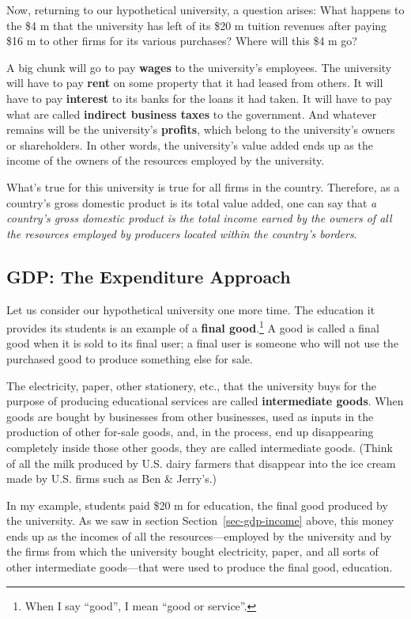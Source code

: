 \documentclass[
  letterpaper,
]{book}
\begin{document}
Now, returning to our hypothetical university, a question arises: What
happens to the \$4 m that the university has left of its \$20 m tuition
revenues after paying \$16 m to other firms for its various purchases?
Where will this \$4 m go?

A big chunk will go to pay \textbf{wages} to the university's employees.
The university will have to pay \textbf{rent} on some property that it
had leased from others. It will have to pay \textbf{interest} to its
banks for the loans it had taken. It will have to pay what are called
\textbf{indirect business taxes} to the government. And whatever remains
will be the university's \textbf{profits}, which belong to the
university's owners or shareholders. In other words, the university's
value added ends up as the income of the owners of the resources
employed by the university.

What's true for this university is true for all firms in the country.
Therefore, as a country's gross domestic product is its total value
added, one can say that \emph{a country's gross domestic product is the
total income earned by the owners of all the resources employed by
producers located within the country's borders}.

\subsection{GDP: The Expenditure Approach}\label{sec-gdp-expenditure}

Let us consider our hypothetical university one more time. The education
it provides its students is an example of a \textbf{final
good}.\footnote{When I say ``good'', I mean ``good or service''.} A good
is called a final good when it is sold to its final user; a final user
is someone who will not use the purchased good to produce something else
for sale.

The electricity, paper, other stationery, etc., that the university buys
for the purpose of producing educational services are called
\textbf{intermediate goods}. When goods are bought by businesses from
other businesses, used as inputs in the production of other for-sale
goods, and, in the process, end up disappearing completely inside those
other goods, they are called intermediate
goods. (Think of all the milk produced by U.S.
dairy farmers that disappear into the ice cream made by U.S. firms such
as Ben \& Jerry's.)

In my example, students paid \$20 m for education, the final good
produced by the university. As we saw in section
Section~\ref{sec-gdp-income} above, this money ends up as the incomes of
all the resources---employed by the university and by the firms from
which the university bought electricity, paper, and all sorts of other
intermediate goods---that were used to produce the final good,
education.
\end{document}

